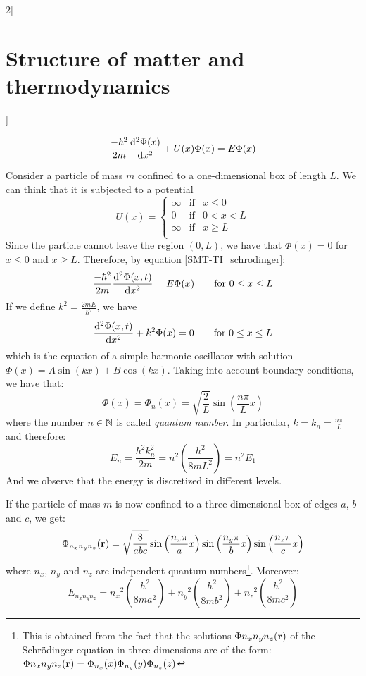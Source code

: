 \documentclass[../../../main.tex]{subfiles}
\begin{document}
\begin{multicols}{2}[\section{Structure of matter and thermodynamics}]
\begin{definition}
\begin{equation}
            \frac{-\hbar^2}{2m}\dv[2]{\Phi(x)}{x}+U(x)\Phi(x)=E\Phi(x)
        \end{equation}
    \end{definition}
    \begin{prop}
        Consider a particle of mass $m$ confined to a one-dimensional box of length $L$. We can think that it is subjected to a potential $$U(x)=\left\{
            \begin{array}{lll}
                \infty & \text{if} & x\leq 0   \\
                0      & \text{if} & 0 < x < L \\
                \infty & \text{if} & x\geq L   \\
            \end{array}
            \right.$$
        Since the particle cannot leave the region $(0,L)$, we have that $\Phi(x)=0$ for $x\leq 0$ and $x\geq L$. Therefore, by equation \eqref{SMT-TI_schrodinger}:
        $$
            \frac{-\hbar^2}{2m}\dv[2]{\Phi(x,t)}{x}=E\Phi(x)\qquad\text{for }0\leq x\leq L
        $$
        If we define $k^2=\frac{2m E}{\hbar^2}$, we have
        $$
            \dv[2]{\Phi(x,t)}{x}+k^2\Phi(x)=0\qquad\text{for }0\leq x\leq L
        $$
        which is the equation of a simple harmonic oscillator with solution $\Phi(x)=A\sin(kx)+B\cos(kx)$. Taking into account boundary conditions, we have that: $$\Phi(x)=\Phi_n(x)=\sqrt{\frac{2}{L}}\sin\left(\frac{n\pi}{L}x\right)$$ where the number $n\in\mathbb{N}$ is called \textit{quantum number}. In particular, $k=k_n=\frac{n\pi}{L}$ and therefore: $$E_n=\frac{\hbar^2k_n^2}{2m}=n^2\left(\frac{h^2}{8mL^2}\right)=n^2E_1$$ And we observe that the energy is discretized in different levels.
    \end{prop}
    \begin{prop}
        If the particle of mass $m$ is now confined to a three-dimensional box of edges $a$, $b$ and $c$, we get:
        $$\Phi_{n_xn_yn_z}(\vb{r})=\sqrt{\frac{8}{abc}}\sin\left(\frac{n_x\pi}{a}x\right)\sin\left(\frac{n_y\pi}{b}x\right)\sin\left(\frac{n_z\pi}{c}x\right)$$
        where $n_x$, $n_y$ and $n_z$ are independent quantum numbers\footnote{This is obtained from the fact that the solutions $\Phi{n_xn_yn_z}(\vb{r})$ of the Schrödinger equation in three dimensions are of the form: $\Phi{n_xn_yn_z}(\vb{r})=\Phi_{n_x}(x)\Phi_{n_y}(y)\Phi_{n_z}(z)$}. Moreover:
        $$E_{n_xn_yn_z}={n_x}^2\left(\frac{h^2}{8ma^2}\right)+{n_y}^2\left(\frac{h^2}{8mb^2}\right)+{n_z}^2\left(\frac{h^2}{8mc^2}\right)$$

\end{prop}
\end{multicols}
\end{document}
